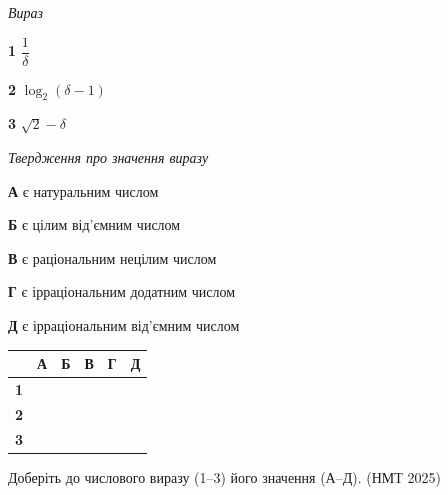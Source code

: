 \documentclass[14pt]{extarticle}
\newcommand{\matchTable}{
\begin{tabular}{|>{\centering\arraybackslash}p{0.3cm}|*{5}{>{\centering\arraybackslash}p{0.3cm}|}}
\hline
& \textbf{А} & \textbf{Б} & \textbf{В} & \textbf{Г} & \textbf{Д} \\
\hline
\textbf{1} & \rule{0pt}{0.3cm} & & & & \\
\hline
\textbf{2} & \rule{0pt}{0.3cm} & & & & \\
\hline
\textbf{3} & \rule{0pt}{0.3cm} & & & & \\
\hline
\end{tabular}
}
\newcommand{\task}[2]{\noindent\makebox[1.5em][l]{\textbf{#1.}}\parbox[t]{\dimexpr\textwidth-1.5em}{#2}}
\newcommand{\nmtyear}[1]{\hfill{\small\color{yearcolor}(НМТ #1)}}
\begin{document}
\vspace{0.3cm}
\begin{minipage}{0.3\textwidth}
\textit{Вираз}

\vspace{0.3cm}
\textbf{1} \quad $\dfrac{1}{\delta}$

\vspace{0.2cm}
\textbf{2} \quad $\log_2(\delta - 1)$

\vspace{0.2cm}
\textbf{3} \quad $\sqrt{2} - \delta$
\end{minipage}
\hfill
\begin{minipage}{0.45\textwidth}
\textit{Твердження про значення виразу}

\vspace{0.2cm}
\textbf{А} \quad є натуральним числом

\vspace{0.2cm}
\textbf{Б} \quad є цілим від'ємним числом

\vspace{0.2cm}
\textbf{В} \quad є раціональним нецілим числом

\vspace{0.2cm}
\textbf{Г} \quad є ірраціональним додатним числом

\vspace{0.2cm}
\textbf{Д} \quad є ірраціональним від'ємним числом
\end{minipage}
\hfill
\begin{minipage}{0.15\textwidth}
\matchTable
\end{minipage}

\vspace{0.7cm}

\task{49}{Доберіть до числового виразу (1--3) його значення (А--Д). \nmtyear{2025}}
\end{document}

